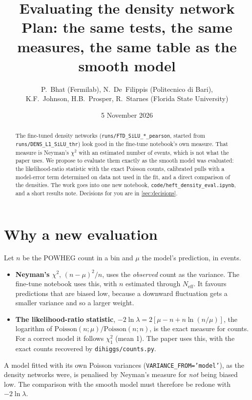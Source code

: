 \documentclass[11pt]{article}
\title{\textbf{Evaluating the density network}\\[4pt]
\large Plan: the same tests, the same measures, the same table as the smooth model}
\author{P.~Bhat (Fermilab), N.~De~Filippis (Politecnico di Bari),\\
K.F.~Johnson, H.B.~Prosper, R.~Starnes (Florida State University)}
\date{5 November 2026}
\newcommand{\file}[1]{\nolinkurl{#1}}
\newcommand{\code}[1]{\texttt{#1}}
\begin{document}
\maketitle

\begin{abstract}
\noindent
The fine-tuned density networks (\file{runs/FTD_SiLU_*_pearson}, started from
\file{runs/DENS_L1_SiLU_thr}) look good in the fine-tune notebook's own measure. That measure
is Neyman's $\chi^2$ with an estimated number of events, which is not what the paper uses. We
propose to evaluate them exactly as the smooth model was evaluated: the likelihood-ratio
statistic with the exact Poisson counts, calibrated pulls with a model-error term determined on
data not used in the fit, and a direct comparison of the densities. The work goes into one new
notebook, \file{code/heft_density_eval.ipynb}, and a short results note. Decisions for you are in
\cref{sec:decisions}.
\end{abstract}

\tableofcontents

\section{Why a new evaluation}

\begin{aside}
Let $n$ be the POWHEG count in a bin and $\mu$ the model's prediction, in events.
\begin{itemize}
  \item \textbf{Neyman's $\chi^2$}, $(n-\mu)^2/n$, uses the \emph{observed} count as the variance.
    The fine-tune notebook uses this, with $n$ estimated through $N_\text{eff}$. It favours
    predictions that are biased low, because a downward fluctuation gets a smaller variance and
    so a larger weight.
  \item \textbf{The likelihood-ratio statistic}, $-2\ln\lambda = 2[\mu - n + n\ln(n/\mu)]$, the
    logarithm of $\mathrm{Poisson}(n;\mu)/\mathrm{Poisson}(n;n)$, is the exact measure for counts.
    For a correct model it follows $\chi^2_1$ (mean 1). The paper uses this, with the exact counts
    recovered by \file{dihiggs/counts.py}.
\end{itemize}
A model fitted with its own Poisson variances (\code{VARIANCE\_FROM='model'}), as the density
networks were, is penalised by Neyman's measure for \emph{not} being biased low. The comparison
with the smooth model must therefore be redone with $-2\ln\lambda$.
\end{aside}
\end{document}
